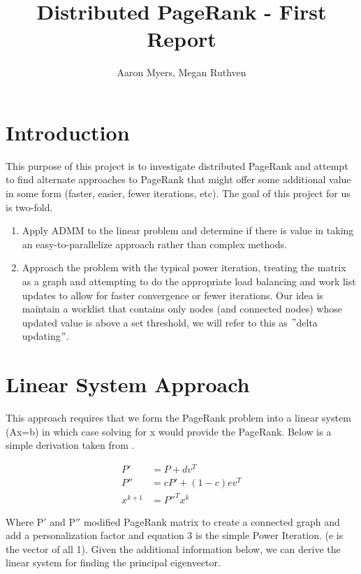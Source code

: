 \documentclass[a4paper,10pt]{article}
\title{Distributed PageRank - First Report}
\author{Aaron Myers, Megan Ruthven}
\begin{document}
\maketitle
\tableofcontents
\pagebreak
\section{Introduction}
This purpose of this project is to investigate distributed PageRank and attempt to find alternate approaches to PageRank that might offer some additional value in some form (faster, easier, fewer iterations, etc). The goal of this project for us is two-fold.
\begin{enumerate}
\item Apply ADMM \cite{ADMM} to the linear problem and determine if there is value in taking an easy-to-parallelize approach rather than complex methods.
\item Approach the problem with the typical power iteration, treating the matrix as a graph and attempting to do the appropriate load balancing and work list updates to allow for faster convergence or fewer iterations. Our idea is maintain a worklist that contains only nodes (and connected nodes) whose updated value is above a set threshold, we will refer to this as $"$delta updating$"$.
\end{enumerate}

\section{Linear System Approach}
This approach requires that we form the PageRank problem into a linear system (Ax=b) in which case solving for x would provide the PageRank. Below is a simple derivation taken from \cite{Fast Parallel}.
\begin{center}
\begin{align}
	P' &= P + dv^{T} \\
	P'' &= cP' + (1-c)ev^{T} \\
	x^{k+1} &= P''^{T}x^{k}
\end{align}

\end{center}
Where P$'$ and P$''$ modified PageRank matrix to create a connected graph and add a personalization factor and equation 3 is the simple Power Iteration. (e is the vector of all 1).
\newline
Given the additional information below, we can derive the linear system for finding the principal eigenvector.
\end{document}
